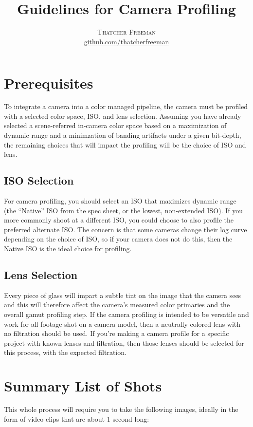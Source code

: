 \documentclass[twoside]{article}
\title{Guidelines for Camera Profiling} %
\author{%
    \textsc{Thatcher Freeman} \\[1ex] %
    \normalsize \href{https://github.com/thatcherfreeman}{github.com/thatcherfreeman}
}
\date{}%
\begin{document}
\maketitle

\tableofcontents

\section{Prerequisites}
To integrate a camera into a color managed pipeline, the camera must be profiled with a selected color space, ISO, and lens selection. Assuming you have already selected a scene-referred in-camera color space based on a maximization of dynamic range and a minimzation of banding artifacts under a given bit-depth, the remaining choices that will impact the profiling will be the choice of ISO and lens.

\subsection{ISO Selection}
For camera profiling, you should select an ISO that maximizes dynamic range (the ``Native'' ISO from the spec sheet, or the lowest, non-extended ISO). If you more commonly shoot at a different ISO, you could choose to also profile the preferred alternate ISO. The concern is that some cameras change their log curve depending on the choice of ISO, so if your camera does not do this, then the Native ISO is the ideal choice for profiling.

\subsection{Lens Selection}
Every piece of glass will impart a subtle tint on the image that the camera sees and this will therefore affect the camera's measured color primaries and the overall gamut profiling step. If the camera profiling is intended to be versatile and work for all footage shot on a camera model, then a neutrally colored lens with no filtration should be used. If you're making a camera profile for a specific project with known lenses and filtration, then those lenses should be selected for this process, with the expected filtration.

\newpage \section{Summary List of Shots}
This whole process will require you to take the following images, ideally in the form of video clips that are about 1 second long:
\end{document}
